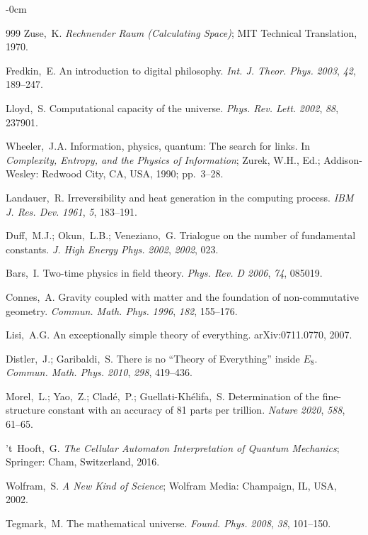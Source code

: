 \documentclass[entropy,article,submit,pdftex,oneauthor]{Definitions/mdpi}
\begin{document}
\begin{adjustwidth}{-\extralength}{0cm}
\begin{thebibliography}{999}
Zuse,~K. \textit{Rechnender Raum (Calculating Space)}; MIT Technical Translation, 1970.

Fredkin,~E. An introduction to digital philosophy. \textit{Int. J. Theor. Phys.} \emph{2003}, \textit{42}, 189--247.

Lloyd,~S. Computational capacity of the universe. \textit{Phys. Rev. Lett.} \emph{2002}, \textit{88}, 237901.

Wheeler,~J.A. Information, physics, quantum: The search for links. In \textit{Complexity, Entropy, and the Physics of Information}; Zurek, W.H., Ed.; Addison-Wesley: Redwood City, CA, USA, 1990; pp.~3--28.

Landauer,~R. Irreversibility and heat generation in the computing process. \textit{IBM J. Res. Dev.} \emph{1961}, \textit{5}, 183--191.

Duff,~M.J.; Okun,~L.B.; Veneziano,~G. Trialogue on the number of fundamental constants. \textit{J. High Energy Phys.} \emph{2002}, \textit{2002}, 023.

Bars,~I. Two-time physics in field theory. \textit{Phys. Rev. D} \emph{2006}, \textit{74}, 085019.

Connes,~A. Gravity coupled with matter and the foundation of non-commutative geometry. \textit{Commun. Math. Phys.} \emph{1996}, \textit{182}, 155--176.

Lisi,~A.G. An exceptionally simple theory of everything. arXiv:0711.0770, 2007.

Distler,~J.; Garibaldi,~S. There is no ``Theory of Everything'' inside $E_8$. \textit{Commun. Math. Phys.} \emph{2010}, \textit{298}, 419--436.

Morel,~L.; Yao,~Z.; Clad\'{e},~P.; Guellati-Kh\'{e}lifa,~S. Determination of the fine-structure constant with an accuracy of 81 parts per trillion. \textit{Nature} \emph{2020}, \textit{588}, 61--65.

't~Hooft,~G. \textit{The Cellular Automaton Interpretation of Quantum Mechanics}; Springer: Cham, Switzerland, 2016.

Wolfram,~S. \textit{A New Kind of Science}; Wolfram Media: Champaign, IL, USA, 2002.

Tegmark,~M. The mathematical universe. \textit{Found. Phys.} \emph{2008}, \textit{38}, 101--150.


\end{thebibliography}
\end{adjustwidth}
\end{document}
